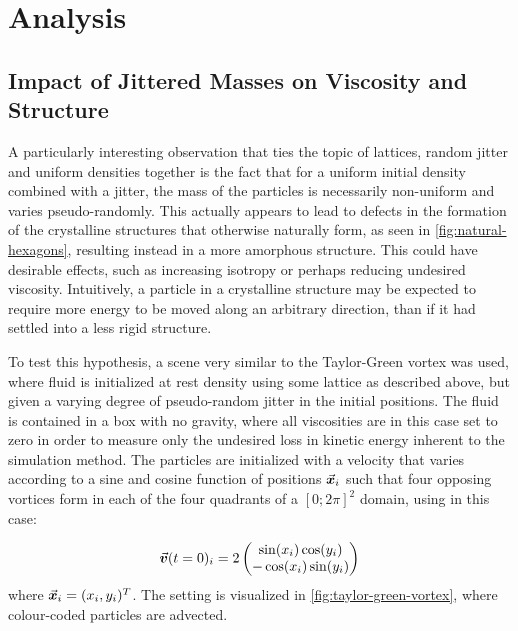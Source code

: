 
\chapter{Analysis}\label{chp:analysis}

\section{Impact of Jittered Masses on Viscosity and Structure}

A particularly interesting observation that ties the topic of lattices, random jitter and uniform densities together is the fact that for a uniform initial density combined with a jitter, the mass of the particles is necessarily non-uniform and varies pseudo-randomly. This actually appears to lead to defects in the formation of the crystalline structures that otherwise naturally form, as seen in \autoref{fig:natural-hexagons}, resulting instead in a more amorphous structure. This could have desirable effects, such as increasing isotropy or perhaps reducing undesired viscosity. Intuitively, a particle in a crystalline structure may be expected to require more energy to be moved along an arbitrary direction, than if it had settled into a less rigid structure.

To test this hypothesis, a scene very similar to the Taylor-Green vortex was used, where fluid is initialized at rest density using some lattice as described above, but given a varying degree of pseudo-random jitter in the initial positions. The fluid is contained in a box with no gravity, where all viscosities are in this case set to zero in order to measure only the undesired loss in kinetic energy inherent to the simulation method. The particles are initialized with a velocity that varies according to a sine and cosine function of positions $\vec{\bm{x}}_i$ such that four opposing vortices form in each of the four quadrants of a $[0;2\pi]^2$ domain, using in this case\autocite*{taylor-green-arxiv}:

\begin{equation}
  \vec{\bm{v}}(t=0)_i = 2\begin{pmatrix}
    \sin(x_i) \cos(y_i) \\
    -\cos(x_i) \sin(y_i)
  \end{pmatrix}
\end{equation}
where $\vec{\bm{x}}_i = (x_i, y_i)^T$. The setting is visualized in \autoref{fig:taylor-green-vortex}, where colour-coded particles are advected.

